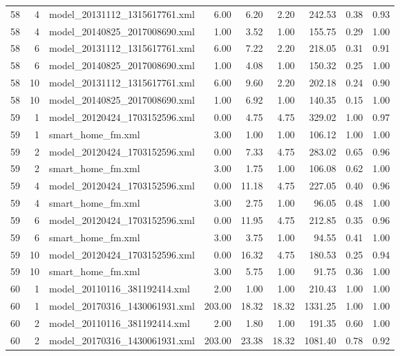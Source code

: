 \begin{table}[ht]
\begin{tabular}{rrlrrrrrr}
   58 &   4 & model\_20131112\_1315617761.xml & 6.00 & 6.20 & 2.20 & 242.53 & 0.38 & 0.93 \\ 
   58 &   4 & model\_20140825\_2017008690.xml & 1.00 & 3.52 & 1.00 & 155.75 & 0.29 & 1.00 \\ 
   58 &   6 & model\_20131112\_1315617761.xml & 6.00 & 7.22 & 2.20 & 218.05 & 0.31 & 0.91 \\ 
   58 &   6 & model\_20140825\_2017008690.xml & 1.00 & 4.08 & 1.00 & 150.32 & 0.25 & 1.00 \\ 
   58 &  10 & model\_20131112\_1315617761.xml & 6.00 & 9.60 & 2.20 & 202.18 & 0.24 & 0.90 \\ 
   58 &  10 & model\_20140825\_2017008690.xml & 1.00 & 6.92 & 1.00 & 140.35 & 0.15 & 1.00 \\ 
   59 &   1 & model\_20120424\_1703152596.xml & 0.00 & 4.75 & 4.75 & 329.02 & 1.00 & 0.97 \\ 
   59 &   1 & smart\_home\_fm.xml & 3.00 & 1.00 & 1.00 & 106.12 & 1.00 & 1.00 \\ 
   59 &   2 & model\_20120424\_1703152596.xml & 0.00 & 7.33 & 4.75 & 283.02 & 0.65 & 0.96 \\ 
   59 &   2 & smart\_home\_fm.xml & 3.00 & 1.75 & 1.00 & 106.08 & 0.62 & 1.00 \\ 
   59 &   4 & model\_20120424\_1703152596.xml & 0.00 & 11.18 & 4.75 & 227.05 & 0.40 & 0.96 \\ 
   59 &   4 & smart\_home\_fm.xml & 3.00 & 2.75 & 1.00 & 96.05 & 0.48 & 1.00 \\ 
   59 &   6 & model\_20120424\_1703152596.xml & 0.00 & 11.95 & 4.75 & 212.85 & 0.35 & 0.96 \\ 
   59 &   6 & smart\_home\_fm.xml & 3.00 & 3.75 & 1.00 & 94.55 & 0.41 & 1.00 \\ 
   59 &  10 & model\_20120424\_1703152596.xml & 0.00 & 16.32 & 4.75 & 180.53 & 0.25 & 0.94 \\ 
   59 &  10 & smart\_home\_fm.xml & 3.00 & 5.75 & 1.00 & 91.75 & 0.36 & 1.00 \\ 
   60 &   1 & model\_20110116\_381192414.xml & 2.00 & 1.00 & 1.00 & 210.43 & 1.00 & 1.00 \\ 
   60 &   1 & model\_20170316\_1430061931.xml & 203.00 & 18.32 & 18.32 & 1331.25 & 1.00 & 1.00 \\ 
   60 &   2 & model\_20110116\_381192414.xml & 2.00 & 1.80 & 1.00 & 191.35 & 0.60 & 1.00 \\ 
   60 &   2 & model\_20170316\_1430061931.xml & 203.00 & 23.38 & 18.32 & 1081.40 & 0.78 & 0.92 \\ 

\end{tabular}
\end{table}
